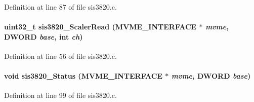 Definition at line 87 of file sis3820.c.
\paragraph[{sis3820\_\-ScalerRead}]{\setlength{\rightskip}{0pt plus 5cm}uint32\_\-t sis3820\_\-ScalerRead ({\bf MVME\_\-INTERFACE} $\ast$ {\em mvme}, \/  {\bf DWORD} {\em base}, \/  int {\em ch})}\hfill\label{sis3820_8c_aded2977e93622bfb2ef2bd271ea6695f}


Definition at line 56 of file sis3820.c.
\paragraph[{sis3820\_\-Status}]{\setlength{\rightskip}{0pt plus 5cm}void sis3820\_\-Status ({\bf MVME\_\-INTERFACE} $\ast$ {\em mvme}, \/  {\bf DWORD} {\em base})}\hfill\label{sis3820_8c_aea6d182191767b9bac21254ef208e9f1}


Definition at line 99 of file sis3820.c.